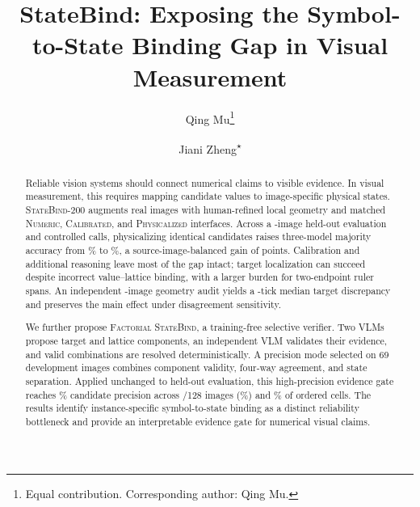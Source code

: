 \documentclass[a4paper]{llncs}
\newcommand{\repeatthanks}{\textsuperscript{$\star$}}
\newcommand{\dataset}{\textsc{StateBind-200}}
\newcommand{\numeric}{\textsc{Numeric}}
\newcommand{\calibrated}{\textsc{Calibrated}}
\newcommand{\physicalized}{\textsc{Physicalized}}
\newcommand{\factorial}{\textsc{Factorial StateBind}}
\begin{document}
\title{StateBind: Exposing the Symbol-to-State Binding Gap in Visual Measurement}
\author{Qing Mu\thanks{Equal contribution. Corresponding author: Qing Mu.} \and
Jiani Zheng\repeatthanks{}}
\maketitle
\pagestyle{empty}
\thispagestyle{empty}

\begin{abstract}
Reliable vision systems should connect numerical claims to visible evidence. In visual measurement, this requires mapping candidate values to image-specific physical states. \dataset{} augments \DatasetImages{} real images with human-refined local geometry and matched \numeric{}, \calibrated{}, and \physicalized{} interfaces. Across a \PairedImages{}-image held-out evaluation and \FormalCalls{} controlled calls, physicalizing identical candidates raises three-model majority accuracy from \MajorityNumeric\% to \MajorityPhysicalized\%, a source-image-balanced gain of \MajorityBalancedGain{} points. Calibration and additional reasoning leave most of the gap intact; target localization can succeed despite incorrect value--lattice binding, with a larger burden for two-endpoint ruler spans. An independent \GeometryAuditImages{}-image geometry audit yields a \GeometryAuditTargetMedian{}-tick median target discrepancy and preserves the main effect under disagreement sensitivity.

We further propose \factorial{}, a training-free selective verifier. Two VLMs propose target and lattice components, an independent VLM validates their evidence, and valid combinations are resolved deterministically. A precision mode selected on 69 development images combines component validity, four-way agreement, and state separation. Applied unchanged to held-out evaluation, this high-precision evidence gate reaches \FactorialTestPrecision\% candidate precision across \FactorialTestImages{}/128 images (\FactorialImageCoverage\%) and \FactorialTestCoverage\% of ordered cells. The results identify instance-specific symbol-to-state binding as a distinct reliability bottleneck and provide an interpretable evidence gate for numerical visual claims.

\end{abstract}










\clearpage


\end{document}
